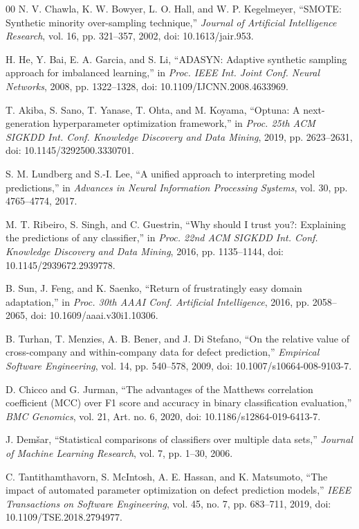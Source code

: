 \documentclass[conference]{IEEEtran}
\begin{document}
\begin{thebibliography}{00}
N. V. Chawla, K. W. Bowyer, L. O. Hall, and
W. P. Kegelmeyer,
``SMOTE: Synthetic minority over-sampling technique,''
\emph{Journal of Artificial Intelligence Research},
vol. 16, pp. 321--357, 2002,
doi: 10.1613/jair.953.

H. He, Y. Bai, E. A. Garcia, and S. Li,
``ADASYN: Adaptive synthetic sampling approach for
imbalanced learning,''
in \emph{Proc. IEEE Int. Joint Conf. Neural Networks},
2008, pp. 1322--1328,
doi: 10.1109/IJCNN.2008.4633969.

T. Akiba, S. Sano, T. Yanase, T. Ohta, and M. Koyama,
``Optuna: A next-generation hyperparameter optimization
framework,''
in \emph{Proc. 25th ACM SIGKDD Int. Conf. Knowledge
Discovery and Data Mining}, 2019, pp. 2623--2631,
doi: 10.1145/3292500.3330701.

S. M. Lundberg and S.-I. Lee,
``A unified approach to interpreting model predictions,''
in \emph{Advances in Neural Information Processing Systems},
vol. 30, pp. 4765--4774, 2017.

M. T. Ribeiro, S. Singh, and C. Guestrin,
``Why should I trust you?: Explaining the predictions of
any classifier,''
in \emph{Proc. 22nd ACM SIGKDD Int. Conf. Knowledge
Discovery and Data Mining}, 2016, pp. 1135--1144,
doi: 10.1145/2939672.2939778.

B. Sun, J. Feng, and K. Saenko,
``Return of frustratingly easy domain adaptation,''
in \emph{Proc. 30th AAAI Conf. Artificial Intelligence},
2016, pp. 2058--2065,
doi: 10.1609/aaai.v30i1.10306.

B. Turhan, T. Menzies, A. B. Bener, and J. Di Stefano,
``On the relative value of cross-company and within-company
data for defect prediction,''
\emph{Empirical Software Engineering}, vol. 14,
pp. 540--578, 2009,
doi: 10.1007/s10664-008-9103-7.

D. Chicco and G. Jurman,
``The advantages of the Matthews correlation coefficient
(MCC) over F1 score and accuracy in binary classification
evaluation,''
\emph{BMC Genomics}, vol. 21, Art. no. 6, 2020,
doi: 10.1186/s12864-019-6413-7.

J. Dem\v{s}ar,
``Statistical comparisons of classifiers over multiple data
sets,''
\emph{Journal of Machine Learning Research}, vol. 7,
pp. 1--30, 2006.

C. Tantithamthavorn, S. McIntosh, A. E. Hassan, and
K. Matsumoto,
``The impact of automated parameter optimization on defect
prediction models,''
\emph{IEEE Transactions on Software Engineering},
vol. 45, no. 7, pp. 683--711, 2019,
doi: 10.1109/TSE.2018.2794977.

\end{thebibliography}
\end{document}
